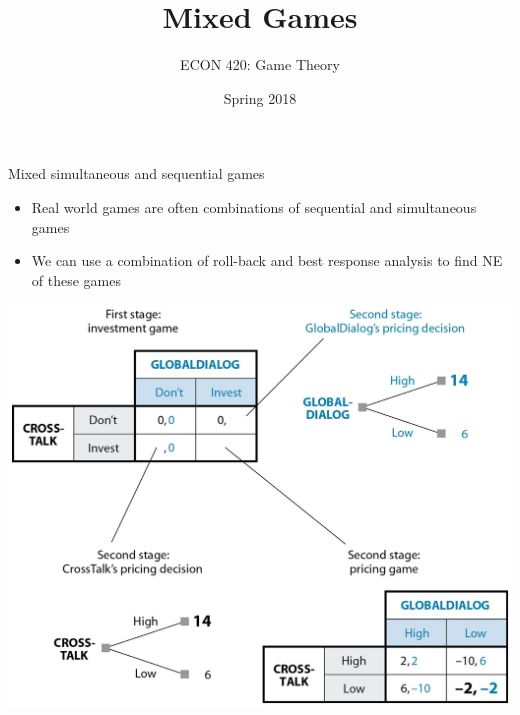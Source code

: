 \documentclass[10pt]{beamer}
\author{ECON 420: Game Theory}
\date{Spring 2018}
\title{Mixed Games}
\begin{document}
\maketitle

\begin{frame}[label={sec:org370fa88}]{}
\alert{Mixed simultaneous and sequential games}
\begin{itemize}
\item Real world games are often combinations of sequential and simultaneous games
\item We can use a combination of roll-back and best response analysis to find NE of these games
\end{itemize}
\end{frame}

\begin{frame}[label={sec:orgaefa102}]{}
\begin{center}
\includegraphics[width=.75\textwidth]{./img/GAMES4_FIG06.01.jpg}
\end{center}
\end{frame}
\end{document}
